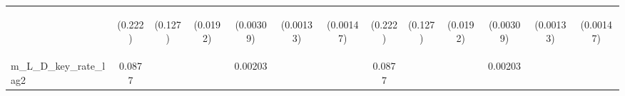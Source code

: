 \documentclass[]{article}
\begin{document}
\begin{center}
\begin{tabular}{lcccccccccccc}
\vspace{4pt} & \begin{footnotesize}(0.222)\end{footnotesize} & \begin{footnotesize}(0.127)\end{footnotesize} & \begin{footnotesize}(0.0192)\end{footnotesize} & \begin{footnotesize}(0.00309)\end{footnotesize} & \begin{footnotesize}(0.00133)\end{footnotesize} & \begin{footnotesize}(0.00147)\end{footnotesize} & \begin{footnotesize}(0.222)\end{footnotesize} & \begin{footnotesize}(0.127)\end{footnotesize} & \begin{footnotesize}(0.0192)\end{footnotesize} & \begin{footnotesize}(0.00309)\end{footnotesize} & \begin{footnotesize}(0.00133)\end{footnotesize} & \begin{footnotesize}(0.00147)\end{footnotesize} \\
m\_L\_D\_key\_rate\_lag2 & 0.0877 &  &  & 0.00203 &  &  & 0.0877 &  &  & 0.00203 &  &  \\

\end{tabular}
\end{center}
\end{document}

